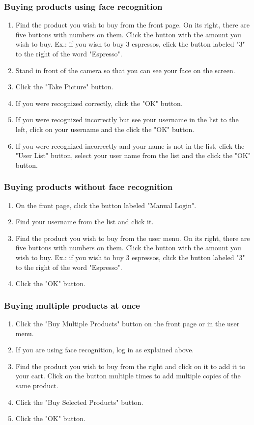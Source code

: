 \documentclass[11pt]{article}
\begin{document}
\subsubsection*{Buying products using face recognition}
\begin{enumerate}
\item{Find the product you wish to buy from the front page. On its right, there are five buttons
with numbers on them. Click the button with the amount you wish to buy. Ex.: if you wish to buy
3 espressos, click the button labeled "3" to the right of the word "Espresso".}
\item{Stand in front of the camera so that you can see your face on the screen.}
\item{Click the "Take Picture" button.}
\item{If you were recognized correctly, click the "OK" button.}
\item{If you were recognized incorrectly but see your username in the list to the left, click
on your username and the click the "OK" button.}
\item{If you were recognized incorrectly and your name is not in the list, click the "User List"
button, select your user name from the list and the click the "OK" button.}
\end{enumerate}
\subsubsection*{Buying products without face recognition}
\begin{enumerate}
\item{On the front page, click the button labeled "Manual Login".}
\item{Find your username from the list and click it.}
\item{Find the product you wish to buy from the user menu. On its right, there are five buttons
with numbers on them. Click the button with the amount you wish to buy. Ex.: if you wish to buy
3 espressos, click the button labeled "3" to the right of the word "Espresso".}
\item{Click the "OK" button.}
\end{enumerate}
\subsubsection*{Buying multiple products at once}
\begin{enumerate}
\item{Click the "Buy Multiple Products" button on the front page or in the user menu.}
\item{If you are using face recognition, log in as explained above.}
\item{Find the product you wish to buy from the right and click on it to add it to your cart.
Click on the button multiple times to add multiple copies of the same product.}
\item{Click the "Buy Selected Products" button.}
\item{Click the "OK" button.}
\end{enumerate}
\end{document}
